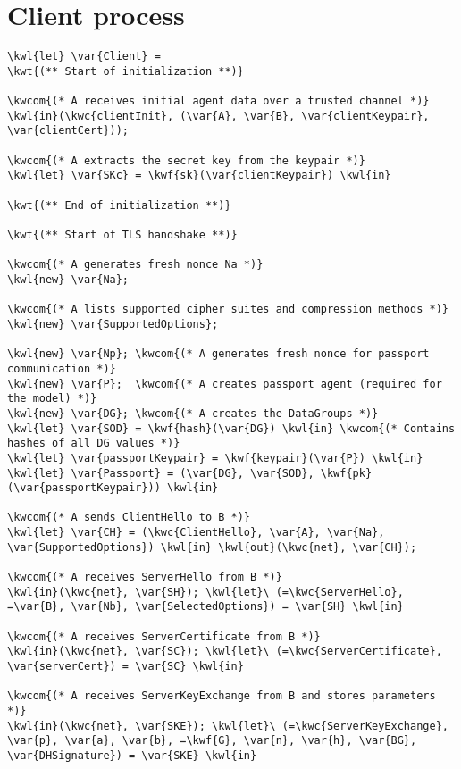 \section{Client process}
\begin{Verbatim}[commandchars=\\\{\}, codes={\catcode`$=3}]
\kwl{let} \var{Client} = 
\kwt{(** Start of initialization **)}

\kwcom{(* A receives initial agent data over a trusted channel *)}
\kwl{in}(\kwc{clientInit}, (\var{A}, \var{B}, \var{clientKeypair}, \var{clientCert}));

\kwcom{(* A extracts the secret key from the keypair *)}
\kwl{let} \var{SKc} = \kwf{sk}(\var{clientKeypair}) \kwl{in}

\kwt{(** End of initialization **)}

\kwt{(** Start of TLS handshake **)}

\kwcom{(* A generates fresh nonce Na *)}
\kwl{new} \var{Na};

\kwcom{(* A lists supported cipher suites and compression methods *)}
\kwl{new} \var{SupportedOptions};

\kwl{new} \var{Np}; \kwcom{(* A generates fresh nonce for passport communication *)}
\kwl{new} \var{P};  \kwcom{(* A creates passport agent (required for the model) *)}
\kwl{new} \var{DG}; \kwcom{(* A creates the DataGroups *)}
\kwl{let} \var{SOD} = \kwf{hash}(\var{DG}) \kwl{in} \kwcom{(* Contains hashes of all DG values *)}
\kwl{let} \var{passportKeypair} = \kwf{keypair}(\var{P}) \kwl{in}
\kwl{let} \var{Passport} = (\var{DG}, \var{SOD}, \kwf{pk}(\var{passportKeypair})) \kwl{in}

\kwcom{(* A sends ClientHello to B *)}
\kwl{let} \var{CH} = (\kwc{ClientHello}, \var{A}, \var{Na}, \var{SupportedOptions}) \kwl{in} \kwl{out}(\kwc{net}, \var{CH});

\kwcom{(* A receives ServerHello from B *)}
\kwl{in}(\kwc{net}, \var{SH}); \kwl{let}\ (=\kwc{ServerHello}, =\var{B}, \var{Nb}, \var{SelectedOptions}) = \var{SH} \kwl{in}

\kwcom{(* A receives ServerCertificate from B *)}
\kwl{in}(\kwc{net}, \var{SC}); \kwl{let}\ (=\kwc{ServerCertificate}, \var{serverCert}) = \var{SC} \kwl{in}

\kwcom{(* A receives ServerKeyExchange from B and stores parameters *)}
\kwl{in}(\kwc{net}, \var{SKE}); \kwl{let}\ (=\kwc{ServerKeyExchange}, \var{p}, \var{a}, \var{b}, =\kwf{G}, \var{n}, \var{h}, \var{BG},
\var{DHSignature}) = \var{SKE} \kwl{in}


\end{Verbatim}
